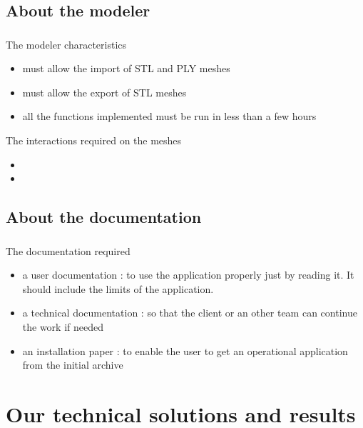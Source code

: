 \documentclass{beamer}
\begin{document}
\subsection{About the modeler}
\begin{frame}
	\frametitle{}
	 \begin{block}{The modeler characteristics}
		\begin{itemize}
			\item must allow the import of STL and PLY meshes
			\item must allow the export of STL meshes
			\item all the functions implemented must be run in less than a few hours
		\end{itemize}
    \end{block}
    
    \begin{block}{The interactions required on the meshes}
		\begin{itemize}
			\item 
			\item 
		\end{itemize}
    \end{block}

\end{frame}

\subsection{About the documentation}
\begin{frame}
	\frametitle{}
	 \begin{block}{The documentation required}
		\begin{itemize}
			\item a user documentation : to use the application properly just by reading it. It should include the limits of the application.
			\item a technical documentation : so that the client or an other team can continue the work if needed
			\item an installation paper : to enable the user to get an operational application from the initial archive
		\end{itemize}
    \end{block}    

\end{frame}

\section{Our technical solutions and results}
\end{document}
